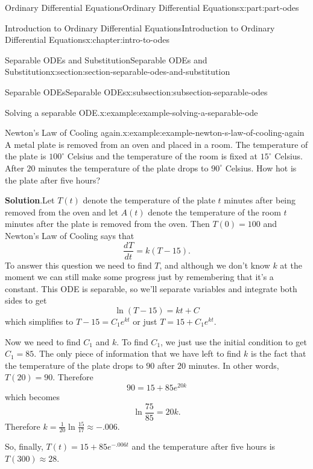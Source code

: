 \documentclass[twoside,10pt,]{book}
\newcommand{\blocktitlefont}{\relax}
\numberwithin{equation}{part}
\providecommand{\dv}[3][]{\dfrac{d^{#1} #2}{d #3^{#1}}}
\begin{document}
\begin{partptx}{Ordinary Differential Equations}{}{Ordinary Differential Equations}{}{}{x:part:part-odes}
\begin{chapterptx}{Introduction to Ordinary Differential Equations}{}{Introduction to Ordinary Differential Equations}{}{}{x:chapter:intro-to-odes}
\begin{sectionptx}{Separable ODEs and Substitution}{}{Separable ODEs and Substitution}{}{}{x:section:section-separable-odes-and-substitution}
\begin{subsectionptx}{Separable ODEs}{}{Separable ODEs}{}{}{x:subsection:subsection-separable-odes}
\begin{example}{Solving a separable ODE.}{x:example:example-solving-a-separable-ode}
\begin{equation*}
\end{equation*}
%
\end{example}
\begin{example}{Newton's Law of Cooling again.}{x:example:example-newton-s-law-of-cooling-again}%
A metal plate is removed from an oven and placed in a room. The temperature of the plate is \(100^{\circ}\) Celsius and the temperature of the room is fixed at \(15^{\circ}\) Celsius. After \(20\) minutes the temperature of the plate drops to \(90^{\circ}\) Celsius. How hot is the plate after five hours?%
\par\smallskip%
\noindent\textbf{\blocktitlefont Solution}.\hypertarget{g:solution:idp105548816350752}{}\quad{}Let \(T(t)\) denote the temperature of the plate \(t\) minutes after being removed from the oven and let \(A(t)\) denote the temperature of the room \(t\) minutes after the plate is removed from the oven. Then \(T(0) = 100\) and Newton's Law of Cooling says that%
%
\begin{equation*}
\dv{T}{t} = k(T-15).
\end{equation*}
To answer this question we need to find \(T\), and although we don't know \(k\) at the moment we can still make some progress just by remembering that it's a constant. This ODE is separable, so we'll separate variables and integrate both sides to get%
\begin{equation*}
\ln(T-15) = kt+C
\end{equation*}
which simplifies to \(T-15 = C_{1}e^{kt}\) or just \(T = 15+C_{1}e^{kt}\).%
\par
Now we need to find \(C_{1}\) and \(k\). To find \(C_{1}\), we just use the initial condition to get \(C_{1} = 85\). The only piece of information that we have left to find \(k\) is the fact that the temperature of the plate drops to \(90\) after \(20\) minutes. In other words, \(T(20) = 90\). Therefore%
\begin{equation*}
90 = 15+85e^{20k}
\end{equation*}
which becomes%
\begin{equation*}
\ln\frac{75}{85} = 20k\text{.}
\end{equation*}
Therefore \(k = \frac{1}{20}\ln\frac{15}{17}\approx-.006.\)%
\par
So, finally, \(T(t) = 15+85e^{-.006t}\) and the temperature after five hours is \(T(300)\approx28\).%
\end{example}
\end{subsectionptx}
%
%
\typeout{************************************************}

\end{sectionptx}
\end{chapterptx}
\end{partptx}
\end{document}
